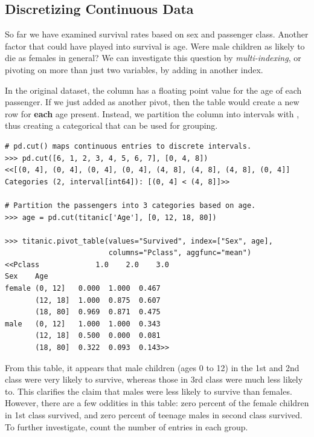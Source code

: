 \subsection*{Discretizing Continuous Data} %

So far we have examined survival rates based on sex and passenger class.
Another factor that could have played into survival is age.
Were male children as likely to die as females in general?
We can investigate this question by \emph{multi-indexing}, or pivoting on more than just two variables, by adding in another index.

In the original dataset, the  column has a floating point value for the age of each passenger.
If we just added  as another pivot, then the table would create a new row for \textbf{each} age present.
Instead, we partition the  column into intervals with , thus creating a categorical that can be used for grouping.

\newpage

\begin{lstlisting}
# pd.cut() maps continuous entries to discrete intervals.
>>> pd.cut([6, 1, 2, 3, 4, 5, 6, 7], [0, 4, 8])
<<[(0, 4], (0, 4], (0, 4], (0, 4], (4, 8], (4, 8], (4, 8], (0, 4]]
Categories (2, interval[int64]): [(0, 4] < (4, 8]]>>

# Partition the passengers into 3 categories based on age.
>>> age = pd.cut(titanic['Age'], [0, 12, 18, 80])

>>> titanic.pivot_table(values="Survived", index=["Sex", age],
                        columns="Pclass", aggfunc="mean")
<<Pclass             1.0    2.0    3.0
Sex    Age
female (0, 12]   0.000  1.000  0.467
       (12, 18]  1.000  0.875  0.607
       (18, 80]  0.969  0.871  0.475
male   (0, 12]   1.000  1.000  0.343
       (12, 18]  0.500  0.000  0.081
       (18, 80]  0.322  0.093  0.143>>
\end{lstlisting}

From this table, it appears that male children (ages 0 to 12) in the 1st and 2nd class were very likely to survive, whereas those in 3rd class were much less likely to.
This clarifies the claim that males were less likely to survive than females.
However, there are a few oddities in this table: zero percent of the female children in 1st class survived, and zero percent of teenage males in second class survived.
To further investigate, count the number of entries in each group.

%

